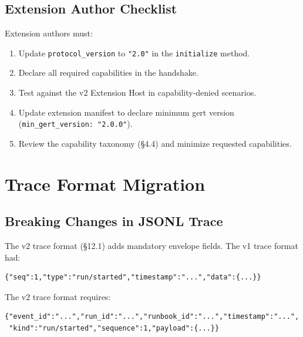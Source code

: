 \subsection{Extension Author Checklist}

Extension authors must:
\begin{enumerate}
  \item Update \texttt{protocol\_version} to \texttt{"2.0"} in the \texttt{initialize} method.
  \item Declare all required capabilities in the handshake.
  \item Test against the v2 Extension Host in capability-denied scenarios.
  \item Update extension manifest to declare minimum gert version (\texttt{min\_gert\_version: "2.0.0"}).
  \item Review the capability taxonomy (§4.4) and minimize requested capabilities.
\end{enumerate}

\section{Trace Format Migration}
\label{sec:trace-migration}

\subsection{Breaking Changes in JSONL Trace}

The v2 trace format (§12.1) adds mandatory envelope fields. The v1 trace format had:

\begin{verbatim}
{"seq":1,"type":"run/started","timestamp":"...","data":{...}}
\end{verbatim}

The v2 trace format requires:

\begin{verbatim}
{"event_id":"...","run_id":"...","runbook_id":"...","timestamp":"...",
 "kind":"run/started","sequence":1,"payload":{...}}
\end{verbatim}


